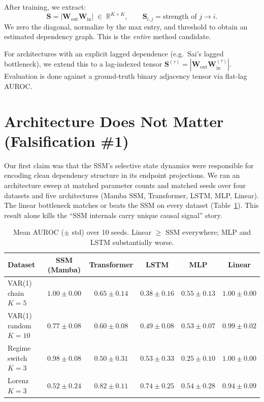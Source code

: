 \documentclass{article}
\begin{document}
After training, we extract:
\begin{equation}
  \mathbf{S} = \left| \mathbf{W}_{\text{out}} \mathbf{W}_{\text{in}} \right|
  \;\in\; \mathbb{R}^{K \times K},
  \qquad \mathbf{S}_{i,j} = \text{strength of }j \to i.
\end{equation}
We zero the diagonal, normalize by the max entry, and threshold to
obtain an estimated dependency graph. This is the \emph{entire}
method candidate.

For architectures with an explicit lagged dependence (e.g.\ Sai's
lagged bottleneck), we extend this to a lag-indexed tensor
$\mathbf{S}^{(\tau)} = |\mathbf{W}_{\text{out}}
\mathbf{W}^{(\tau)}_{\text{in}}|$. Evaluation is done against a
ground-truth binary adjacency tensor via flat-lag AUROC.

\section{Architecture Does Not Matter (Falsification \#1)}
\label{sec:arch}

Our first claim was that the SSM's selective state dynamics were
responsible for encoding clean dependency structure in its endpoint
projections. We ran an architecture sweep at matched parameter counts
and matched seeds over four datasets and five architectures
(Mamba SSM, Transformer, LSTM, MLP, Linear). The linear bottleneck
matches or beats the SSM on every dataset (Table~\ref{tab:arch}).
This result alone kills the ``SSM internals carry unique causal
signal'' story.

\begin{table}[t]
\centering
\small
\caption{Mean AUROC ($\pm$ std) over 10 seeds. Linear $\ge$ SSM
everywhere; MLP and LSTM substantially worse.}
\label{tab:arch}
\begin{tabular}{lccccc}
\toprule
Dataset & SSM (Mamba) & Transformer & LSTM & MLP & \textbf{Linear} \\
\midrule
VAR(1) chain $K{=}5$ & $1.00 {\pm} 0.00$ & $0.65 {\pm} 0.14$ & $0.38 {\pm} 0.16$ & $0.55 {\pm} 0.13$ & $\mathbf{1.00 \pm 0.00}$ \\
VAR(1) random $K{=}10$ & $0.77 {\pm} 0.08$ & $0.60 {\pm} 0.08$ & $0.49 {\pm} 0.08$ & $0.53 {\pm} 0.07$ & $\mathbf{0.99 \pm 0.02}$ \\
Regime switch $K{=}3$ & $0.98 {\pm} 0.08$ & $0.50 {\pm} 0.31$ & $0.53 {\pm} 0.33$ & $0.25 {\pm} 0.10$ & $\mathbf{1.00 \pm 0.00}$ \\
Lorenz $K{=}3$ & $0.52 {\pm} 0.24$ & $0.82 {\pm} 0.11$ & $0.74 {\pm} 0.25$ & $0.54 {\pm} 0.28$ & $\mathbf{0.94 \pm 0.09}$ \\
\bottomrule
\end{tabular}
\end{table}
\end{document}
